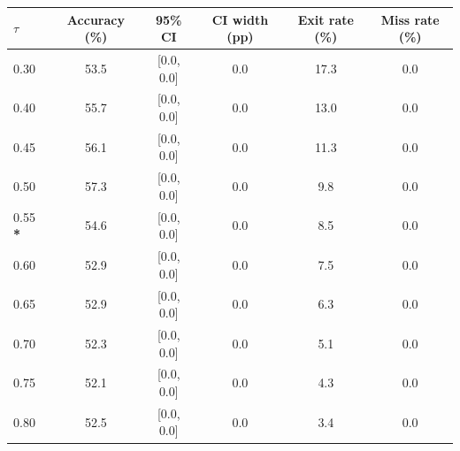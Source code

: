 \begin{tabular}{lccccc}
\toprule
$\tau$ & Accuracy (\%) & 95\% CI & CI width (pp) & Exit rate (\%) & Miss rate (\%) \\
\midrule
0.30 & 53.5 & [0.0, 0.0] & 0.0 & 17.3 & 0.0 \\
0.40 & 55.7 & [0.0, 0.0] & 0.0 & 13.0 & 0.0 \\
0.45 & 56.1 & [0.0, 0.0] & 0.0 & 11.3 & 0.0 \\
0.50 & 57.3 & [0.0, 0.0] & 0.0 & 9.8 & 0.0 \\
0.55 \textbf{*} & 54.6 & [0.0, 0.0] & 0.0 & 8.5 & 0.0 \\
0.60 & 52.9 & [0.0, 0.0] & 0.0 & 7.5 & 0.0 \\
0.65 & 52.9 & [0.0, 0.0] & 0.0 & 6.3 & 0.0 \\
0.70 & 52.3 & [0.0, 0.0] & 0.0 & 5.1 & 0.0 \\
0.75 & 52.1 & [0.0, 0.0] & 0.0 & 4.3 & 0.0 \\
0.80 & 52.5 & [0.0, 0.0] & 0.0 & 3.4 & 0.0 \\
\bottomrule
\end{tabular}
